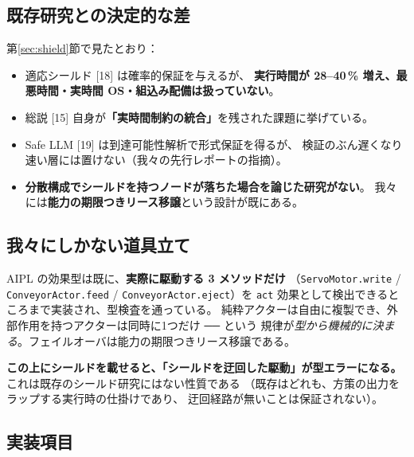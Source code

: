 \documentclass[11pt,a4paper]{article}
\newcommand{\code}[1]{\texttt{#1}}
\newcommand{\prob}[1]{\textbf{\textcolor{red!55!black}{#1}}}
\newcommand{\keyp}[1]{\textbf{\textcolor{blue!45!black}{#1}}}
\begin{document}
\subsection{既存研究との決定的な差}

第\ref{sec:shield}節で見たとおり：

\begin{itemize}[leftmargin=1.4em,itemsep=3pt]
  \item 適応シールド [18] は確率的保証を与えるが、
        \prob{実行時間が 28--40\,\% 増え、最悪時間・実時間 OS・組込み配備は扱っていない}。
  \item 総説 [15] 自身が\keyp{「実時間制約の統合」}を残された課題に挙げている。
  \item Safe LLM [19] は到達可能性解析で形式保証を得るが、
        検証のぶん遅くなり速い層には置けない（我々の先行レポートの指摘）。
  \item \prob{分散構成でシールドを持つノードが落ちた場合を論じた研究がない}。
        我々には\keyp{能力の期限つきリース移譲}という設計が既にある。
\end{itemize}

\subsection{我々にしかない道具立て}

AIPL の効果型は既に、\keyp{実際に駆動する 3 メソッドだけ}
（\code{ServoMotor.write} / \code{ConveyorActor.feed} / \code{ConveyorActor.eject}）を
\code{act} 効果として検出できるところまで実装され、型検査を通っている。
純粋アクターは自由に複製でき、外部作用を持つアクターは同時に1つだけ ── という
規律が\emph{型から機械的に決まる}。フェイルオーバは能力の期限つきリース移譲である。

\noindent
\keyp{この上にシールドを載せると、「シールドを迂回した駆動」が型エラーになる。}
これは既存のシールド研究にはない性質である
（既存はどれも、方策の出力をラップする実行時の仕掛けであり、
迂回経路が無いことは保証されない）。

\subsection{実装項目}
\end{document}
